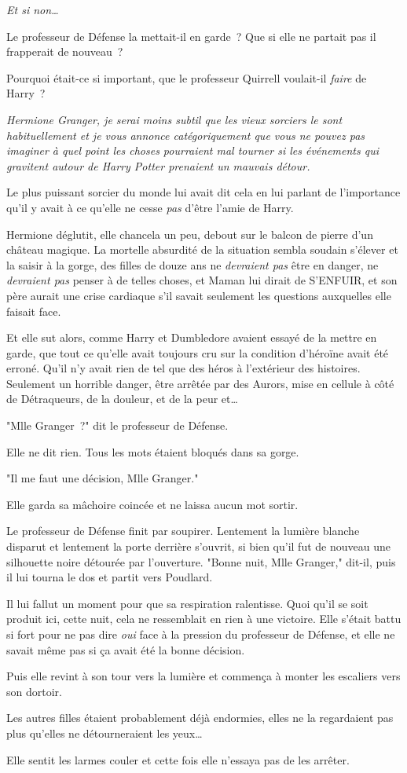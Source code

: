 \emph{Et si non…}

Le professeur de Défense la mettait-il en garde~? Que si elle ne partait pas il frapperait de nouveau~?

Pourquoi était-ce si important, que le professeur Quirrell voulait-il \emph{faire} de Harry~?

\emph{Hermione Granger, je serai moins subtil que les vieux sorciers le sont habituellement et je vous annonce catégoriquement que vous ne pouvez pas imaginer à quel point les choses pourraient mal tourner si les événements qui gravitent autour de Harry Potter prenaient un mauvais détour.}

Le plus puissant sorcier du monde lui avait dit cela en lui parlant de l'importance qu'il y avait à ce qu'elle ne cesse \emph{pas} d'être l'amie de Harry.

Hermione déglutit, elle chancela un peu, debout sur le balcon de pierre d'un château magique. La mortelle absurdité de la situation sembla soudain s'élever et la saisir à la gorge, des filles de douze ans ne \emph{devraient pas} être en danger, ne \emph{devraient pas} penser à de telles choses, et Maman lui dirait de S'ENFUIR, et son père aurait une crise cardiaque s'il savait seulement les questions auxquelles elle faisait face.

Et elle sut alors, comme Harry et Dumbledore avaient essayé de la mettre en garde, que tout ce qu'elle avait toujours cru sur la condition d'héroïne avait été erroné. Qu'il n'y avait rien de tel que des héros à l'extérieur des histoires. Seulement un horrible danger, être arrêtée par des Aurors, mise en cellule à côté de Détraqueurs, de la douleur, et de la peur et…

"Mlle Granger~?" dit le professeur de Défense.

Elle ne dit rien. Tous les mots étaient bloqués dans sa gorge.

"Il me faut une décision, Mlle Granger."

Elle garda sa mâchoire coincée et ne laissa aucun mot sortir.

Le professeur de Défense finit par soupirer. Lentement la lumière blanche disparut et lentement la porte derrière s'ouvrit, si bien qu'il fut de nouveau une silhouette noire détourée par l'ouverture. "Bonne nuit, Mlle Granger," dit-il, puis il lui tourna le dos et partit vers Poudlard.

Il lui fallut un moment pour que sa respiration ralentisse. Quoi qu'il se soit produit ici, cette nuit, cela ne ressemblait en rien à une victoire. Elle s'était battu si fort pour ne pas dire \emph{oui} face à la pression du professeur de Défense, et elle ne savait même pas si ça avait été la bonne décision.

Puis elle revint à son tour vers la lumière et commença à monter les escaliers vers son dortoir.

Les autres filles étaient probablement déjà endormies, elles ne la regardaient pas plus qu'elles ne détourneraient les yeux…

Elle sentit les larmes couler et cette fois elle n'essaya pas de les arrêter. 

